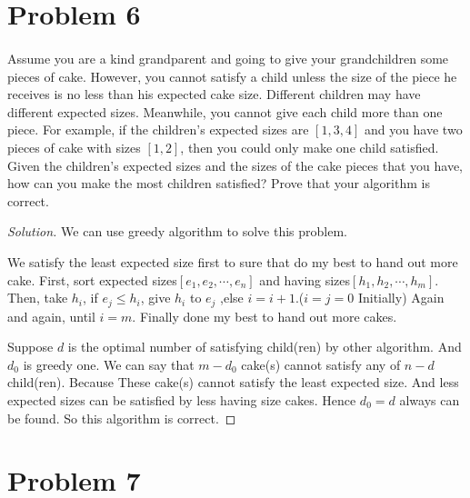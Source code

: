 \documentclass[a4paper]{article}
\newenvironment{solution}
  {\renewcommand\qedsymbol{$\blacksquare$}\begin{proof}[Solution]}
  {\end{proof}}
\begin{document}
\section*{Problem 6}
\paragraph{}
Assume you are a kind grandparent and going to give your grandchildren some pieces of cake. However,
you cannot satisfy a child unless the size of the piece he receives is no less than his expected cake size.
Different children may have different expected sizes. Meanwhile, you cannot give each child more than one
piece. For example, if the children’s expected sizes are $[1, 3, 4]$ and you have two pieces of cake with sizes
$[1, 2]$, then you could only make one child satisfied. Given the children’s expected sizes and the sizes of the
cake pieces that you have, how can you make the most children satisfied? Prove that your algorithm is
correct.
\begin{solution}
  We can use greedy algorithm to solve this problem.

  We satisfy the least expected size first to sure
  that do my best to hand out more cake. First, sort
  expected sizes$[e_{1},e_{2},\cdots ,e_{n}]$ and
  having sizes$[h_{1},h_{2},\cdots ,h_{m}]$. Then, take $h_{i}$,
  if $e_{j}\le h_{i}$, give $h_{i}$ to $e_{j}$ ,else $i=i+1$.($i=j=0$ Initially)
  Again and again, until $i=m$. Finally done my best to hand out more cakes.


  Suppose $d$ is the optimal number of satisfying child(ren) by other algorithm. And $d_{0}$ is greedy one.
  We can say that $m-d_{0}$ cake(s) cannot satisfy any of $n-d$ child(ren). Because
  These cake(s) cannot satisfy the least expected size. And less expected sizes can be satisfied
  by less having size cakes. Hence $d_{0}=d$ always can be found. So this algorithm is correct.
\end{solution}

\section*{Problem 7}
\end{document}
